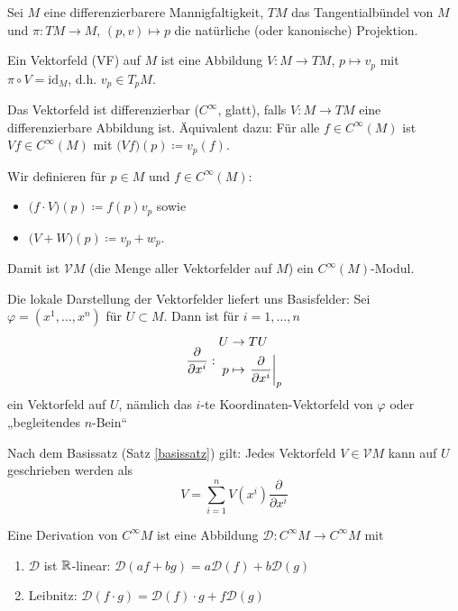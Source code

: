 \documentclass[a4paper,twoside,DIV15,BCOR12mm]{scrbook}
\renewcommand{\da}{\coloneqq}
\newcommand{\V}{\mathcal V}
\begin{document}
\begin{definition}
Sei $M$ eine differenzierbarere Mannigfaltigkeit, $TM$ das Tangentialbündel von $M$ und $\pi: TM \to M$, $(p,v)\mapsto p$ die natürliche (oder kanonische) Projektion.

Ein Vektorfeld (VF) auf $M$ ist eine Abbildung $V : M \to TM$, $p\mapsto v_p$ mit $\pi \circ V = \text{id}_M$, d.h. $v_p \in T_pM$.

Das Vektorfeld ist differenzierbar ($C^\infty$, glatt), falls $V: M \to TM$ eine differenzierbare Abbildung ist. Äquivalent dazu: Für alle $f\in C^\infty(M)$ ist $Vf\in C^\infty(M)$ mit $\big(Vf\big)(p) \da v_p(f)$.

Wir definieren für $p\in M$ und $f\in C^\infty(M)$:
\begin{itemize}
\item $\big(f\cdot V\big)(p) \da f(p) v_p$ sowie
\item $\big(V+W\big)(p) \da v_p + w_p$.
\end{itemize}
Damit ist $\V M$ (die Menge aller Vektorfelder auf $M$) ein $C^\infty(M)$-Modul.
\end{definition}

Die lokale Darstellung der Vektorfelder liefert uns Basisfelder:
Sei $\varphi = (x^1,\ldots,x^n)$ für $U\subset M$. Dann ist für $i=1,\ldots,n$
\[
\frac{\partial}{\partial x^i}:
\begin{aligned}
U&\to TU\\
p&\mapsto \left.\frac{\partial}{\partial x^{i}}\right|_p
\end{aligned}
\]
ein Vektorfeld auf $U$, nämlich das $i$-te Koordinaten-Vektorfeld von $\varphi$ oder „begleitendes $n$-Bein“

Nach dem Basissatz (Satz \ref{basissatz}) gilt: Jedes Vektorfeld $V\in \V M $ kann auf $U$ geschrieben werden als 
\[
V = \sum_{i=1}^n V(x^i) \frac{\partial}{\partial x^i}
\]

\begin{definition}
Eine Derivation von $C^\infty M$ ist eine Abbildung $\mathcal{D}: C^\infty M \to C^\infty M$ mit
\begin{enumerate}[(D1)]
\item $\mathcal{D}$ ist $\mathbb{R}$-linear: $\mathcal{D}(af+ bg) = a\mathcal D(f) + b\mathcal D(g)$
\item Leibnitz: $\mathcal D(f\cdot g) = \mathcal D(f)\cdot g + f\mathcal D(g)$
\end{enumerate}
\end{definition}
\end{document}
